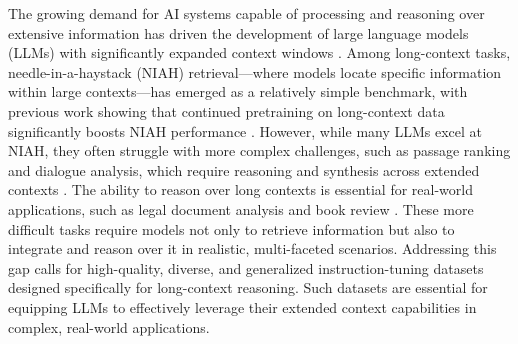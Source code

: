 The growing demand for AI systems capable of processing and reasoning over extensive information has driven the development of large language models (LLMs) with significantly expanded context windows \citep{dubey2024llama, achiam2023gpt, team2024gemini}. 
Among long-context tasks, needle-in-a-haystack (NIAH) \citep{niah} retrieval—where models locate specific information within large contexts—has emerged as a relatively simple benchmark, with previous work showing that continued pretraining on long-context data significantly boosts NIAH performance \citep{fudata, hsieh2024ruler, li2024needlebenchllmsretrievalreasoning}.
However, while many LLMs excel at NIAH, they often struggle with more complex challenges, such as passage ranking and dialogue analysis, which require reasoning and synthesis across extended contexts \citep{hsieh2024ruler, yen2025helmet, zhang2024infinitebench, levy-etal-2024-task, vodrahalli2024michelangelolongcontextevaluations, li2024alr2retrievethenreasonframeworklongcontext}. 
The ability to reason over long contexts is essential for real-world applications, such as legal document analysis and book review \citep{liu2024lost, karpinska2024one, xuretrieval, xu2024detectiveqa, jimenez2024swebench, wang-etal-2024-leave}.
These more difficult tasks require models not only to retrieve information but also to integrate and reason over it in realistic, multi-faceted scenarios. Addressing this gap calls for high-quality, diverse, and generalized instruction-tuning datasets designed specifically for long-context reasoning. Such datasets are essential for equipping LLMs to effectively leverage their extended context capabilities in complex, real-world applications.





